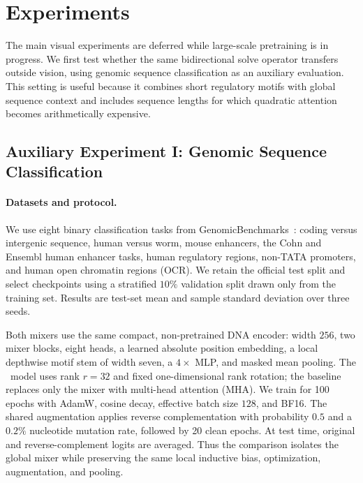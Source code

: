 \section{Experiments}
\label{sec:experiments}

The main visual experiments are deferred while large-scale pretraining is in
progress. We first test whether the same bidirectional solve operator transfers
outside vision, using genomic sequence classification as an auxiliary
evaluation. This setting is useful because it combines short regulatory motifs
with global sequence context and includes sequence lengths for which quadratic
attention becomes arithmetically expensive.

\subsection{Auxiliary Experiment I: Genomic Sequence Classification}

\paragraph{Datasets and protocol.}
We use eight binary classification tasks from
GenomicBenchmarks~\cite{gresova2023genomic}: coding versus intergenic sequence,
human versus worm, mouse enhancers, the Cohn and Ensembl human enhancer tasks,
human regulatory regions, non-TATA promoters, and human open chromatin regions
(OCR). We retain the official test split and select checkpoints using a
stratified $10\%$ validation split drawn only from the training set. Results are
test-set mean and sample standard deviation over three seeds.

Both mixers use the same compact, non-pretrained DNA encoder: width $256$, two
mixer blocks, eight heads, a learned absolute position embedding, a local
depthwise motif stem of width seven, a $4\times$ MLP, and masked mean pooling.
The \RRLSSO\ model uses rank $r=32$ and fixed one-dimensional rank rotation;
the baseline replaces only the mixer with multi-head attention (MHA). We train
for 100 epochs with AdamW, cosine decay, effective batch size $128$, and BF16.
The shared augmentation applies reverse complementation with probability
$0.5$ and a $0.2\%$ nucleotide mutation rate, followed by 20 clean epochs.
At test time, original and reverse-complement logits are averaged. Thus the
comparison isolates the global mixer while preserving the same local inductive
bias, optimization, augmentation, and pooling.

